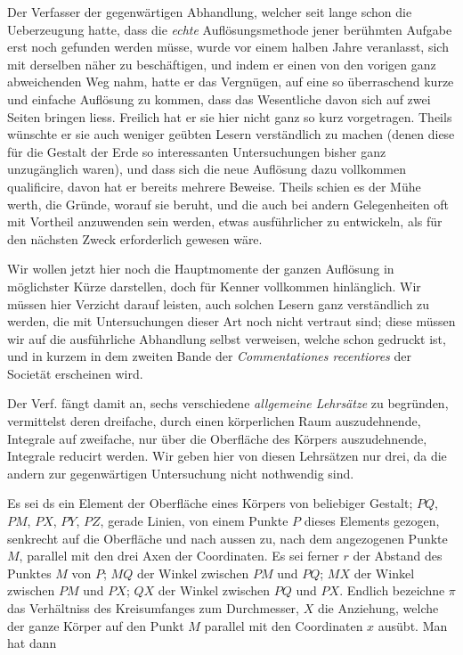 \documentclass[11pt,a4paper]{article}
\begin{document}
Der Verfasser der gegenwärtigen Abhandlung, welcher seit lange schon die Ueberzeugung hatte, dass die \textit{echte} Auflösungsmethode jener berühmten Aufgabe erst noch gefunden werden müsse, wurde vor einem halben Jahre veranlasst, sich mit derselben näher zu beschäftigen, und indem er einen von den vorigen ganz abweichenden Weg nahm, hatte er das Vergnügen, auf eine so überraschend kurze und einfache Auflösung zu kommen, dass das Wesentliche davon sich auf zwei Seiten bringen liess. Freilich hat er sie hier nicht ganz so kurz vorgetragen. Theils wünschte er sie auch weniger geübten Lesern verständlich zu machen (denen diese für die Gestalt der Erde so interessanten Untersuchungen bisher ganz unzugänglich waren), und dass sich die neue Auflösung dazu vollkommen qualificire, davon hat er bereits mehrere Beweise. Theils schien es der Mühe werth, die Gründe, worauf sie beruht, und die auch bei andern Gelegenheiten oft mit Vortheil anzuwenden sein werden, etwas ausführlicher zu entwickeln, als für den nächsten Zweck erforderlich gewesen wäre.

Wir wollen jetzt hier noch die Hauptmomente der ganzen Auflösung in möglichster Kürze darstellen, doch für Kenner vollkommen hinlänglich. Wir müssen hier Verzicht darauf leisten, auch solchen Lesern ganz verständlich zu werden, die mit Untersuchungen dieser Art noch nicht vertraut sind; diese müssen wir auf die ausführliche Abhandlung selbst verweisen, welche schon gedruckt ist, und in kurzem in dem zweiten Bande der \textit{Commentationes recentiores} der Societät erscheinen wird.

Der Verf. fängt damit an, sechs verschiedene \textit{allgemeine Lehrsätze} zu begründen, vermittelst deren dreifache, durch einen körperlichen Raum auszudehnende, Integrale auf zweifache, nur über die Oberfläche des Körpers auszudehnende, Integrale reducirt werden. Wir geben hier von diesen Lehrsätzen nur drei, da die andern zur gegenwärtigen Untersuchung nicht nothwendig sind.

Es sei ds ein Element der Oberfläche eines Körpers von beliebiger Gestalt; $PQ$, $PM$, $PX$, $PY$, $PZ$, gerade Linien, von einem Punkte $P$ dieses Elements gezogen, senkrecht auf die Oberfläche und nach aussen zu, nach dem angezogenen Punkte $M$, parallel mit den drei Axen der Coordinaten. Es sei ferner $r$ der Abstand des Punktes $M$ von $P$; $MQ$ der Winkel zwischen $PM$ und $PQ$; $MX$ der Winkel zwischen $PM$ und $PX$; $QX$ der Winkel zwischen $PQ$ und $PX$. Endlich bezeichne $\pi$ das Verhältniss des Kreisumfanges zum Durchmesser, $X$ die Anziehung, welche der ganze Körper auf den Punkt $M$ parallel mit den Coordinaten $x$ ausübt. Man hat dann
\end{document}
